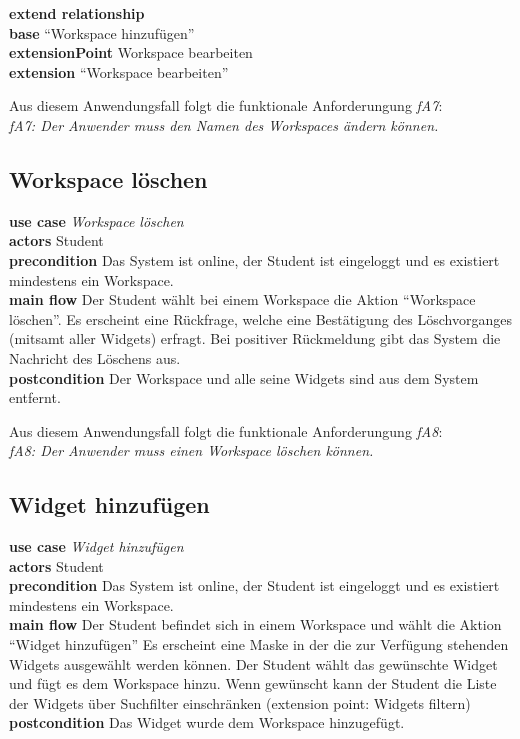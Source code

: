 \textbf{extend relationship}\\
\textbf{base} "`Workspace hinzufügen"'\\
\textbf{extensionPoint} Workspace bearbeiten\\
\textbf{extension} "`Workspace bearbeiten"'
 
Aus diesem Anwendungsfall folgt die funktionale Anforderungung \emph{fA7}:\\
\emph{fA7: Der Anwender muss den Namen des Workspaces ändern können.}\\
 
 \subsection{Workspace löschen}
\textbf{use case} \emph{Workspace löschen}\\
\textbf{actors} Student\\
\textbf{precondition} Das System ist online, der Student ist eingeloggt und es existiert mindestens ein Workspace.\\
\textbf{main flow} Der Student wählt bei einem Workspace die Aktion "`Workspace löschen"'. Es erscheint eine Rückfrage, welche eine Bestätigung des Löschvorganges (mitsamt aller Widgets) erfragt. Bei positiver Rückmeldung gibt das System die Nachricht des Löschens aus. \\
\textbf{postcondition} Der Workspace und alle seine Widgets sind aus dem System entfernt.
 
Aus diesem Anwendungsfall folgt die funktionale Anforderungung \emph{fA8}:\\
\emph{fA8: Der Anwender muss einen Workspace löschen können.}\\

\subsection{Widget hinzufügen}
\textbf{use case} \emph{Widget hinzufügen}\\
\textbf{actors} Student\\
\textbf{precondition} Das System ist online, der Student ist eingeloggt und es existiert mindestens ein Workspace.\\
\textbf{main flow} Der Student befindet sich in einem Workspace und wählt die Aktion "`Widget hinzufügen"' Es erscheint eine Maske in der die zur Verfügung stehenden Widgets ausgewählt werden können. Der Student wählt das gewünschte Widget und fügt es dem Workspace hinzu. Wenn gewünscht kann der Student die Liste der Widgets über Suchfilter einschränken (extension point: Widgets filtern)\\
\textbf{postcondition} Das Widget wurde dem Workspace hinzugefügt.
 
